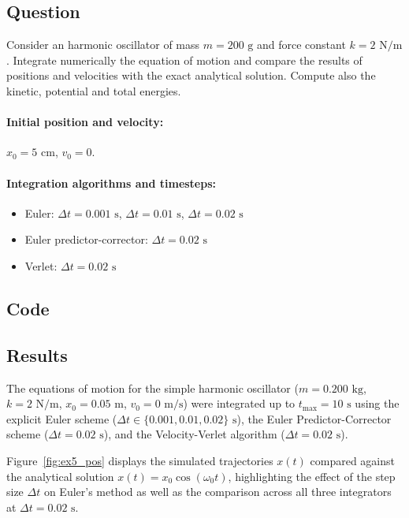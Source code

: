 \documentclass[11pt,a4paper]{article}
\begin{document}
\subsection{Question}
Consider an harmonic oscillator of mass $m = 200\text{ g}$ and force constant $k = 2\text{ N/m}$. Integrate numerically the equation of motion and compare the results of positions and velocities with the exact analytical solution. Compute also the kinetic, potential and total energies.

\paragraph{Initial position and velocity:} $x_0 = 5\text{ cm}$, $v_0 = 0$.

\paragraph{Integration algorithms and timesteps:}
\begin{itemize}
  \item Euler: $\Delta t = 0.001\text{ s}$, $\Delta t = 0.01\text{ s}$, $\Delta t = 0.02\text{ s}$
  \item Euler predictor-corrector: $\Delta t = 0.02\text{ s}$
  \item Verlet: $\Delta t = 0.02\text{ s}$
\end{itemize}

\subsection{Code}


\subsection{Results}
The equations of motion for the simple harmonic oscillator ($m = 0.200\text{ kg}$, $k = 2\text{ N/m}$, $x_0 = 0.05\text{ m}$, $v_0 = 0\text{ m/s}$) were integrated up to $t_{\max} = 10\text{ s}$ using the explicit Euler scheme ($\Delta t \in \{0.001, 0.01, 0.02\}\text{ s}$), the Euler Predictor-Corrector scheme ($\Delta t = 0.02\text{ s}$), and the Velocity-Verlet algorithm ($\Delta t = 0.02\text{ s}$).

Figure~\ref{fig:ex5_pos} displays the simulated trajectories $x(t)$ compared against the analytical solution $x(t) = x_0 \cos(\omega_0 t)$, highlighting the effect of the step size $\Delta t$ on Euler's method as well as the comparison across all three integrators at $\Delta t = 0.02\text{ s}$.
\end{document}
